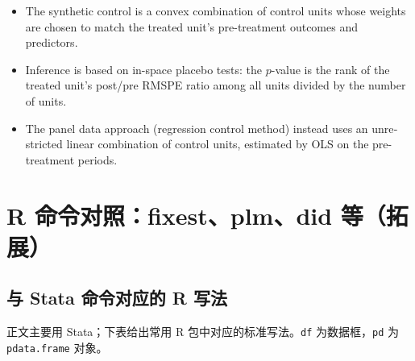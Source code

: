 \begin{english}
\begin{itemize}
  \item The synthetic control is a convex combination of control units whose weights are chosen to match the treated unit's pre-treatment outcomes and predictors.
  \item Inference is based on in-space placebo tests: the $p$-value is the rank of the treated unit's post/pre RMSPE ratio among all units divided by the number of units.
  \item The panel data approach (regression control method) instead uses an unrestricted linear combination of control units, estimated by OLS on the pre-treatment periods.
\end{itemize}
\end{english}

\section{R 命令对照：fixest、plm、did 等（拓展）}\label{sec:UappB-r}

\subsection{与 Stata 命令对应的 R 写法}

正文主要用 Stata；下表给出常用 R 包中对应的标准写法。\texttt{df} 为数据框，\texttt{pd} 为 \texttt{pdata.frame} 对象。


